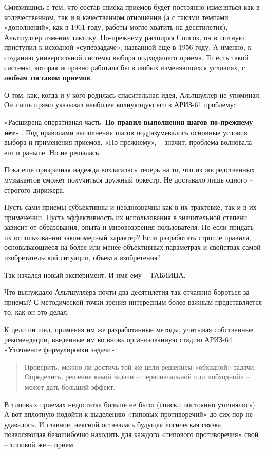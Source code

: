 \documentclass[11pt,a4paper]{article}
\begin{document}
Смирившись с тем, что состав списка приемов будет постоянно изменяться как в
количественном, так и в качественном отношении (а с такими темпами
«дополнений», как в 1961 году, работы могло хватить на десятилетия),
Альтшуллер изменил тактику. По-прежнему расширяя Список, он вплотную приступил
к исходной «суперзадаче», названной еще в 1956 году. А именно, к созданию
универсальной системы выбора подходящего приема. То есть такой системы,
которая исправно работала бы в любых изменяющихся условиях, с \textbf{любым
  составом приемов}.

О том, как, когда и у кого родилась спасительная идея, Альтшуллер не упоминал.
Он лишь прямо указывал наиболее волнующую его в АРИЗ-61 проблему:

«Расширена оперативная часть. \textbf{Но правил выполнения шагов по-прежнему
  нет}» \cite{Altshuller1986a}. Под правилами выполнения шагов подразумевались
основные условия выбора и применения приемов. «По-прежнему», -- значит,
проблема волновала его и раньше. Но не решалась.

Пока еще призрачная надежда возлагалась теперь на то, что из посредственных
музыкантов сможет получиться дружный оркестр. Не доставало лишь одного --
строгого дирижера.

Пусть сами приемы субъективны и неоднозначны как в их трактовке, так и в их
применении. Пусть эффективность их использования в значительной степени
зависит от образования, опыта и мировоззрения пользователя. Но если придать их
использованию закономерный характер? Если разработать строгие правила,
основывающиеся на более или менее объективных параметрах и свойствах самой
изобретательской ситуации, объекта изобретения?

Так начался новый эксперимент. И имя ему -- ТАБЛИЦА.

Что вынуждало Альтшуллера почти два десятилетия так отчаянно бороться за
приемы? С методической точки зрения интересным более важным представляется то,
как он это делал.

К цели он шел, применяя им же разработанные методы, учитывая собственные
рекомендации, введенные им во вновь организованную стадию АРИЗ-64 «Уточнение
формулировки задачи»:
\begin{quote}
  Проверить, можно ли достичь той же цели решением «обходной» задачи.
  Определить, решение какой задачи -- первоначальной или «обходной» -- может
  дать больший эффект.
\end{quote}

В типовых приемах недостатка больше не было (списки постоянно уточнялись). А
вот вплотную подойти к выделению «типовых противоречий» до сих пор не
удавалось. И главное, неясной оставалась будущая логическая связка,
позволяющая безошибочно находить для каждого «типового противоречия» свой --
типовой же -- прием.
\end{document}
